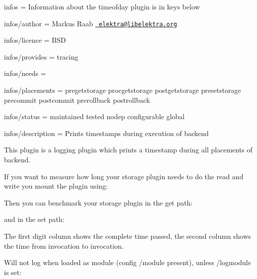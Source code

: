 
\begin{DoxyItemize}
\item infos = Information about the timeofday plugin is in keys below
\item infos/author = Markus Raab \href{mailto:elektra@libelektra.org}{\texttt{ elektra@libelektra.\+org}}
\item infos/licence = B\+SD
\item infos/provides = tracing
\item infos/needs =
\item infos/placements = pregetstorage procgetstorage postgetstorage presetstorage precommit postcommit prerollback postrollback
\item infos/status = maintained tested nodep configurable global
\item infos/description = Prints timestamps during execution of backend
\end{DoxyItemize}

This plugin is a logging plugin which prints a timestamp during all placements of backend.

If you want to measure how long your storage plugin needs to do the read and write you mount the plugin using\+:


\begin{DoxyCode}{0}
\end{DoxyCode}


Then you can benchmark your storage plugin in the get path\+:


\begin{DoxyCode}{0}
\end{DoxyCode}


and in the set path\+:


\begin{DoxyCode}{0}
\end{DoxyCode}


The first digit column shows the complete time passed, the second column shows the time from invocation to invocation.

Will not log when loaded as module (config {\ttfamily /module} present), unless {\ttfamily /logmodule} is set\+:


\begin{DoxyCode}{0}
\end{DoxyCode}
 
